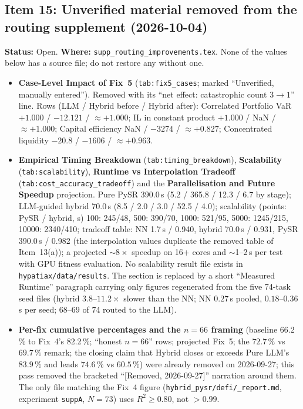 \documentclass[11pt]{article}
\newcommand{\Rsq}{R^{2}}
\begin{document}
\subsection*{Item 15: Unverified material removed from the routing supplement (2026-10-04)}
\textbf{Status:} Open. \textbf{Where:} \texttt{supp\_routing\_improvements.tex}. None of the values below has a source file; do not restore
any without one.
\begin{itemize}\small
\item \textbf{Case-Level Impact of Fix~5} (\texttt{tab:fix5\_cases}; marked ``Unverified, manually entered''). Removed with its ``net effect:
catastrophic count $3\to1$'' line. Rows (LLM / Hybrid before / Hybrid after): Correlated Portfolio VaR $+1.000$ / $-12.121$ / $\approx+1.000$;
IL in constant product $+1.000$ / NaN / $\approx+1.000$; Capital efficiency NaN / $-3274$ / $\approx+0.827$; Concentrated liquidity $-20.8$ / $-1606$ / $\approx+0.963$.
\item \textbf{Empirical Timing Breakdown} (\texttt{tab:timing\_breakdown}), \textbf{Scalability} (\texttt{tab:scalability}), \textbf{Runtime vs Interpolation Tradeoff}
(\texttt{tab:cost\_accuracy\_tradeoff}) and the \textbf{Parallelisation and Future Speedup} projection. Pure PySR 390.0\,s
(5.2 / 365.8 / 12.3 / 6.7 by stage); LLM-guided hybrid 70.0\,s (8.5 / 2.0 / 3.0 / 52.5 / 4.0); scalability (points: PySR / hybrid, s) 100: 245/48,
500: 390/70, 1000: 521/95, 5000: 1245/215, 10000: 2340/410; tradeoff table: NN 1.7\,s / 0.940, hybrid 70.0\,s / 0.931, PySR 390.0\,s / 0.982 (the
interpolation values duplicate the removed table of Item~13(a)); a projected $\sim8\times$ speedup on 16+ cores and $\sim$1--2\,s per test with GPU fitness
evaluation. No scalability result file exists in \texttt{hypatiax/data/results}. The section is replaced by a short ``Measured Runtime'' paragraph carrying only
figures regenerated from the five 74-task seed files (hybrid $3.8$--$11.2\times$ slower than the NN; NN $0.27$\,s pooled, $0.18$--$0.36$\,s per seed;
68--69 of 74 routed to the LLM).
\item \textbf{Per-fix cumulative percentages and the $n{=}66$ framing} (baseline 66.2\,\% to Fix~4's 82.2\,\%; ``honest $n{=}66$'' rows; projected Fix~5; the
$72.7\,\%$ vs $69.7\,\%$ remark; the closing claim that Hybrid closes or exceeds Pure LLM's $83.9\,\%$ and leads $74.6\,\%$ vs $60.5\,\%$) were already removed on
2026-09-27; this pass removed the bracketed ``[Removed, 2026-09-27]'' narration around them. The only file matching the Fix~4 figure
(\texttt{hybrid\_pysr/defi/\_report.md}, experiment \texttt{suppA}, $N=73$) uses $\Rsq\ge0.80$, not $>0.99$.

\end{itemize}
\end{document}
